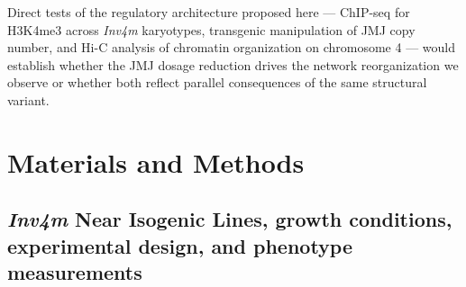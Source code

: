 \documentclass[9pt,twocolumn,twoside]{rilabRxiv}
\newcommand{\invfour}{\textit{Inv4m}\xspace}
\begin{document}
Direct tests of the regulatory architecture proposed here --- ChIP-seq for H3K4me3 across \invfour karyotypes, transgenic manipulation of JMJ copy number, and Hi-C analysis of chromatin organization on chromosome 4 --- would establish whether the JMJ dosage reduction drives the network reorganization we observe or whether both reflect parallel consequences of the same structural variant.

\section{Materials and Methods}
\label{sec:materials:methods}

\subsection{\invfour Near Isogenic Lines, growth conditions, experimental
design, and phenotype measurements}
\end{document}
